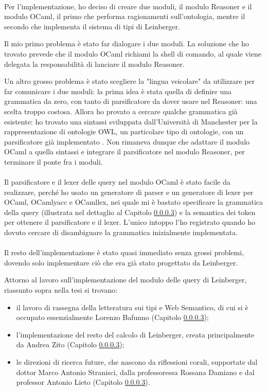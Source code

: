 \paragraph{} Per l'implementazione, ho deciso di creare due moduli, il modulo Reasoner e il modulo OCaml, il primo che performa ragionamenti sull'ontologia, mentre il secondo che implementa il sistema di tipi di Leinberger.

Il mio primo problema è stato far dialogare i due moduli. La soluzione che ho trovato prevede che il modulo OCaml richiami la shell di comando, al quale viene delegata la responsabilità di lanciare il modulo Reasoner.

Un altro grosso problema è stato scegliere la "lingua veicolare" da utilizzare per far comunicare i due moduli: la prima idea è stata quella di definire una grammatica da zero, con tanto di parsificatore da dover usare nel Reasoner: una scelta troppo costosa. Allora ho provato a cercare qualche grammatica già esistente: ho trovato una sintassi sviluppata dall'Università di Manchester per la rappresentazione di ontologie OWL, un particolare tipo di ontologie, con un parsificatore già implementato \cite{}. Non rimaneva dunque che adattare il modulo OCaml a quella sintassi e integrare il parsificatore nel modulo Reasoner, per terminare il ponte fra i moduli.

\paragraph{} Il parsificatore e il lexer delle query nel modulo OCaml è stato facile da realizzare, perché ho usato un generatore di parser e un generatore di lexer per OCaml, OCamlyacc e OCamllex, nei quale mi è bastato specificare la grammatica della query (illustrata nel dettaglio al Capitolo \ref{}) e la semantica dei token per ottenere il parsificatore e il lexer. L'unico intoppo l'ho registrato quando ho dovuto cercare di disambiguare la grammatica inizialmente implementata. 

\paragraph{} Il resto dell'implementazione è stato quasi immediato senza grossi problemi, dovendo solo implementare ciò che era già stato progettato da Leinberger.

Attorno al lavoro sull'implementazione del modulo delle query di Leinberger, riassunto sopra nella tesi si trovano:
\begin{itemize}
\item il lavoro di rassegna della letteratura sui tipi e Web Semantico, di cui si è occupato essenzialmente Lorenzo Bafunno (Capitolo \ref{});
\item l'implementazione del resto del calcolo di Leinberger, creata principalmente da Andrea Zito (Capitolo \ref{});
\item le direzioni di ricerca future, che nascono da riflessioni corali, supportate dal dottor Marco Antonio Stranisci, dalla professoressa Rossana Damiano e dal professor Antonio Lieto (Capitolo \ref{}).
\end{itemize}